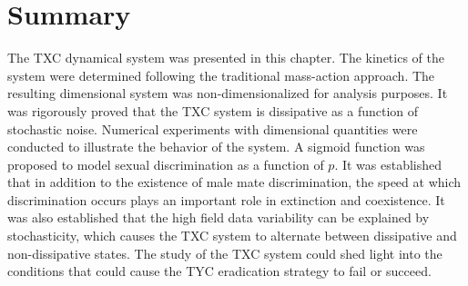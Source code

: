 	\section {Summary}\label{sec:PoeciliaSummary}
	The TXC dynamical system was presented in this chapter. The kinetics of the system were determined following the traditional mass-action approach. The resulting dimensional system was non-dimensionalized for analysis purposes. It was rigorously proved that the TXC system is dissipative as a function of stochastic noise. Numerical experiments with dimensional quantities were conducted to illustrate the behavior of the system. A sigmoid function was proposed to model sexual discrimination as a function of $p$. It was established that in addition to the existence of male mate discrimination, the speed at which discrimination occurs plays an important role in extinction and coexistence. It was also established that the high field data variability can be explained by stochasticity, which causes the TXC system to alternate between dissipative and non-dissipative states.  The study of the TXC system could shed light into the conditions that could cause the TYC eradication strategy to fail or succeed.

\endinput
